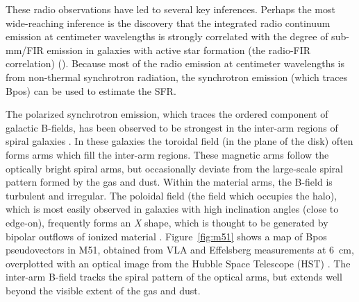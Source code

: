These radio observations have led to several key inferences. Perhaps the most wide-reaching inference is the discovery that the integrated radio continuum emission at centimeter wavelengths is strongly correlated with the degree of sub-mm/FIR emission in galaxies with active star formation (the radio-FIR correlation) (\citet{de1985astronomy,beck2008measuring}). Because most of the radio emission at centimeter wavelengths is from non-thermal synchrotron radiation, the synchrotron emission (which traces \gls{Bpos}) can be used to estimate the SFR\@.

The polarized synchrotron emission, which traces the ordered component of galactic B-fields, has been observed to be strongest in the inter-arm regions of spiral galaxies \citep{beck2016magnetic}. In these galaxies the toroidal field (in the plane of the disk) often forms arms which fill the inter-arm regions. These magnetic arms follow the optically bright spiral arms, but occasionally deviate from the large-scale spiral pattern formed by the gas and dust. Within the material arms, the B-field is turbulent and irregular. The poloidal field (the field which occupies the halo), which is most easily observed in galaxies with high inclination angles (close to edge-on), frequently forms an \textit{X} shape, which is thought to be generated by bipolar outflows of ionized material \citep{ferriere2014analytical}. Figure~\ref{fig:m51} shows a map of \gls{Bpos} pseudovectors in M51, obtained from VLA and Effelsberg measurements at 6~cm, overplotted with an optical image from the Hubble Space Telescope (HST) \citep{fletcher2011magnetic}. The inter-arm B-field tracks the spiral pattern of the optical arms, but extends well beyond the visible extent of the gas and dust.

